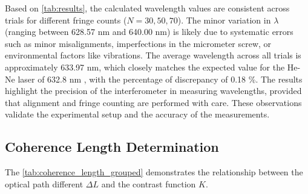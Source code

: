 \documentclass[a4paper,11pt]{article}
\begin{document}
Based on \autoref{tab:results}, the calculated wavelength values are consistent across trials for different fringe counts ($N = 30, 50, 70$). The minor variation in $\lambda$ (ranging between 628.57 nm and 640.00 nm) is likely due to systematic errors such as minor misalignments, imperfections in the micrometer screw, or environmental factors like vibrations. The average wavelength across all trials is approximately 633.97 nm, which closely matches the expected value for the He-Ne laser of 632.8 nm \autocite{lielbeke_2015} \autocite{Thorlabs_HeNeLaser} , with the percentage of discrepancy of 0.18 \%. The results highlight the precision of the interferometer in measuring wavelengths, provided that alignment and fringe counting are performed with care. These observations validate the experimental setup and the accuracy of the measurements.\\

\subsection{Coherence Length Determination}
\indent

The \autoref{tab:coherence_length_grouped} demonstrates the relationship between the optical path different $\Delta L$ and the contrast function $K$.

\begin{table}[H]
  \centering
  \caption{Data for Coherence Length Determination (Sorted by Optical Path Difference) (Code: \autoref{code: Coherence Length Determination})}
  \label{tab:coherence_length_grouped}
\end{table}
\end{document}
